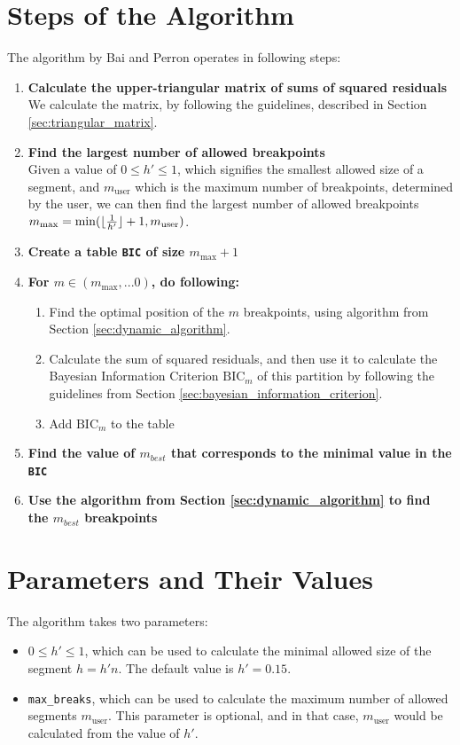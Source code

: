 \documentclass[main.tex]{subfiles}
\begin{document}
\section{Steps of the Algorithm}
\label{sec:steps_of_the_algorithm}
The algorithm by Bai and Perron operates in following steps:
\begin{enumerate}
\item \textbf{Calculate the upper-triangular matrix of sums of squared residuals}\\
  We calculate the matrix, by following the guidelines, described in Section \ref{sec:triangular_matrix}.
\item \textbf{Find the largest number of allowed breakpoints}\\
  Given a value of $0\leq h' \leq 1$, which signifies the smallest allowed size of
  a segment, and $m_{\text{user}}$ which is the maximum number of breakpoints, determined by the user, 
  we can then find the largest number of allowed
  breakpoints $m_{\text{max}} = \min(\lfloor\frac{1}{h'}\rfloor + 1, m_{\text{user}})$.
\item \textbf{Create a table \texttt{BIC} of size $m_{\text{max}} + 1$}
\item \textbf{For $m \in (m_{\text{max}}, ... 0)$, do following:}
  \begin{enumerate}[1)]
  \item Find the optimal position of the $m$ breakpoints, using algorithm
    from Section \ref{sec:dynamic_algorithm}.
  \item Calculate the sum of squared residuals, and then use it to
    calculate the Bayesian Information Criterion $\text{BIC}_m$ of this
    partition by following the guidelines from Section
    \ref{sec:bayesian_information_criterion}.
  \item Add $\text{BIC}_m$ to the table
  \end{enumerate}
\item \textbf{Find the value of $m_{best}$ that corresponds to the minimal value in the \texttt{BIC}}
\item \textbf{Use the algorithm from Section \ref{sec:dynamic_algorithm} to find the $m_{best}$ breakpoints}
\end{enumerate}

\section{Parameters and Their Values}
\label{sec:breakpoints_params}
The algorithm takes two parameters:
\begin{itemize}
\item  $0\leq h' \leq 1$, which can be used to calculate the minimal allowed size of the segment
  $h = h' n$. The default value is $h' = 0.15$.
\item \texttt{max\_breaks}, which can be used to calculate the maximum number of allowed segments
  $m_{\text{user}}$. This parameter is optional, and in that case, $m_{\text{user}}$ would be calculated
  from the value of $h'$.
\end{itemize}



\biblio
\end{document}
